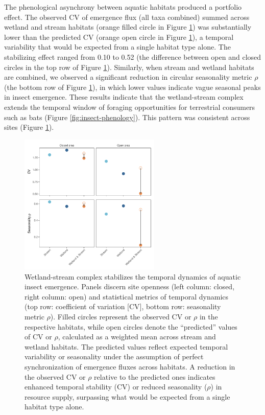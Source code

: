 \documentclass[11pt, class=article, crop=false]{standalone}
\begin{document}
The phenological asynchrony between aquatic habitats produced a portfolio effect.
The observed CV of emergence flux (all taxa combined) summed across wetland and stream habitats (orange filled circle in Figure \ref{fig:cv-emergence}) was substantially lower than the predicted CV (orange open circle in Figure \ref{fig:cv-emergence}), a temporal variability that would be expected from a single habitat type alone.
The stabilizing effect ranged from 0.10 to 0.52 (the difference between open and closed circles in the top row of Figure \ref{fig:cv-emergence}).
Similarly, when stream and wetland habitats are combined, we observed a significant reduction in circular seasonality metric $\rho$ (the bottom row of Figure \ref{fig:cv-emergence}), in which lower values indicate vague seasonal peaks in insect emergence.
These results indicate that the wetland-stream complex extends the temporal window of foraging opportunities for terrestrial consumers such as bats (Figure \ref{fig:insect-phenology}).
This pattern was consistent across sites (Figure \ref{fig:cv-emergence}).

\begin{figure}
    \centering
    \includegraphics[width=0.6\textwidth]{output/figure_cv_rho.pdf}
    \caption{Wetland-stream complex stabilizes the temporal dynamics of aquatic insect emergence. Panels discern site openness (left column: closed, right column: open) and statistical metrics of temporal dynamics (top row: coefficient of variation [CV], bottom row: seasonality metric $\rho$). Filled circles represent the observed CV or $\rho$ in the respective habitats, while open circles denote the ``predicted'' values of CV or $\rho$, calculated as a weighted mean across stream and wetland habitats. The predicted values reflect expected temporal variability or seasonality under the assumption of perfect synchronization of emergence fluxes across habitats. A reduction in the observed CV or $\rho$ relative to the predicted ones indicates enhanced temporal stability (CV) or reduced seasonality ($\rho$) in resource supply, surpassing what would be expected from a single habitat type alone.}
    \label{fig:cv-emergence}
\end{figure}
\end{document}
